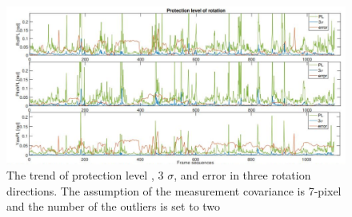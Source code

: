 \documentclass[10pt, letterpaper]{article}
\begin{document}
\author{
zain bin sumait}
\nocite{*}

\begin{figure}[thpb]
    \centering
    \includegraphics[width=\textwidth]{images/frame_se1.png}
    \caption{The trend of protection level , 3 $\sigma$, and error in three rotation directions. The assumption of the measurement covariance is 7-pixel and the number of the outliers is set to two}
    \label{fig:Frame_sequence}
\end{figure}
\end{document}

